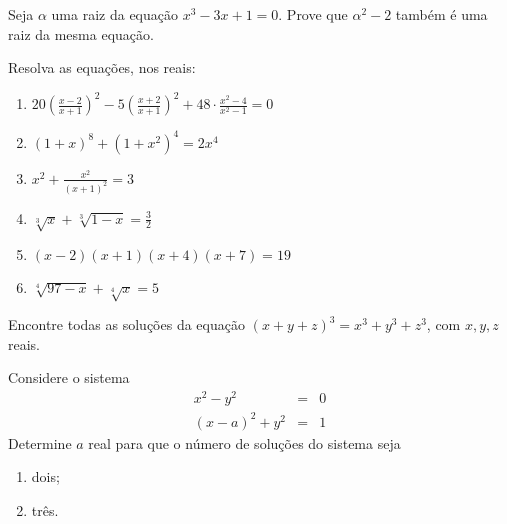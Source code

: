 \begin{questao}
  Seja $\alpha$ uma raiz da equação $x^3-3x+1=0$. Prove que $\alpha^2-2$ também
  é uma raiz da mesma equação.
\end{questao}

\begin{questao}
  Resolva as equações, nos reais:

  \begin{enumerate}

  \item $ 20 \left(\frac{x-2}{x+1}\right)^2 - 5 \left(\frac{x+2}{x+1}\right)^2 +
    48 \cdot \frac{x^2-4}{x^2-1} = 0$

  \item $ (1+x)^8+(1+x^2)^4 = 2x^4$

  \item $ x^2+\frac{x^2}{(x+1)^2} = 3$

  \item $ \sqrt[3]{x}+\sqrt[3]{1-x} = \frac{3}{2} $

  \item $(x-2)(x+1)(x+4)(x+7) = 19$

  \item $ {\sqrt[4]{97-x} + \sqrt[4]{x} = 5}$
  \end{enumerate}

\end{questao}

\begin{questao}
  Encontre todas as soluções da equação ${(x+y+z)^3=x^3+y^3+z^3}$, com $x,y,z$
  reais.
\end{questao}

\begin{questao}
  Considere o sistema
  \begin{eqnarray*}
    x^2-y^2 & = & 0\\ (x-a)^2+y^2 & = & 1
  \end{eqnarray*}
  Determine $a$ real para que o número de soluções do sistema seja

  \begin{enumerate}

  \item dois;

  \item três.
  \end{enumerate}

\end{questao}

